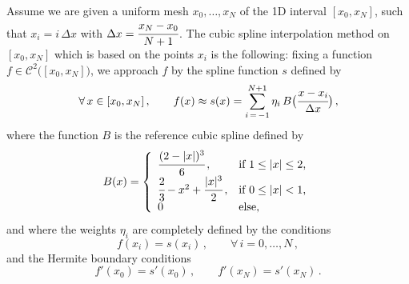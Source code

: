 \documentclass[10pt]{article}
\newcommand{\Cl}{{\mathcal C}}
\begin{document}
Assume we are given a uniform mesh $x_{0},\dots,x_{N}$ of the 1D interval $[x_{0},x_{N}]$, such that $x_{i} = i\,\Delta x$ with $\Delta x = \cfrac{x_{N}-x_{0}}{N+1}$. The cubic spline interpolation method on $[x_{0},x_{N}]$ which is based on the points $x_{i}$ is the following: fixing a function $f \in \Cl^{2}\big([x_{0},x_{N}]\big)$, we approach $f$ by the spline function $s$ defined by
\begin{equation}
\forall\,x \in [x_{0},x_{N}]\, , \qquad f(x) \approx s(x) = \sum_{i\,=\,-1}^{N+1} \eta_{i}\,B\big(\cfrac{x-x_{i}}{\Delta x}\big) \, ,
\end{equation}
where the function $B$ is the reference cubic spline defined by
\begin{equation}
B(x) = \left\{
\begin{array}{ll}
\cfrac{(2-|x|)^{3}}{6} \, , & \textnormal{if $1 \leq |x| \leq 2$,} \\
\cfrac{2}{3}-x^{2} + \cfrac{|x|^{3}}{2} \, , & \textnormal{if $0 \leq |x| < 1$,} \\
0 & \textnormal{else,}
\end{array}
\right.
\end{equation}
and where the weights $\eta_{i}$ are completely defined by the conditions
\begin{equation} \label{interpolation_1D}
f(x_{i}) = s(x_{i}) \, , \qquad \forall\, i=0,\dots,N \, ,
\end{equation}
and the Hermite boundary conditions
\begin{equation} \label{Hermite_1D}
f'(x_{0}) = s'(x_{0}) \, , \qquad f'(x_{N}) = s'(x_{N}) \, .
\end{equation}
\end{document}
